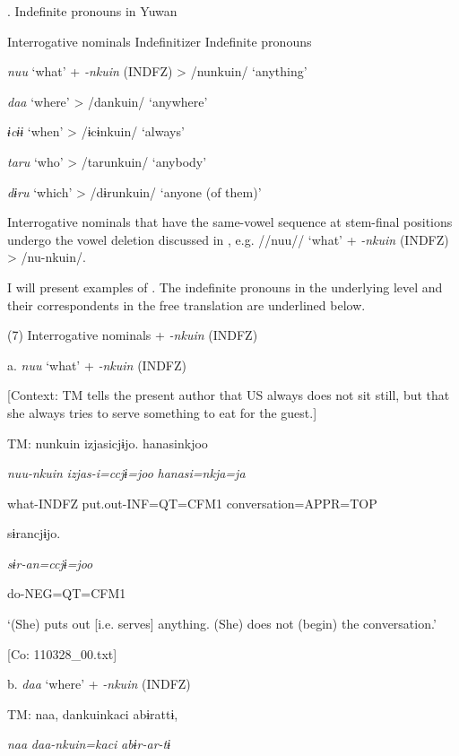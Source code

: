 \begin{styleBeschriftung}
\textmd{}\textmd{. Indefinite pronouns in Yuwan}
\end{styleBeschriftung}

Interrogative nominals    Indefinitizer    Indefinite pronouns

\textit{nuu}  ‘what’  +  \textit{{}-nkuin} (INDFZ)  >  /nunkuin/  ‘anything’

\textit{daa}  ‘where’      >  /dankuin/  ‘anywhere’

\textit{ɨcɨɨ}  ‘when’      >  /ɨcɨnkuin/  ‘always’

\textit{taru}  ‘who’      >  /tarunkuin/  ‘anybody’

\textit{dɨru}  ‘which’      >  /dɨrunkuin/  ‘anyone (of them)’

Interrogative nominals that have the same-vowel sequence at stem-final positions undergo the vowel deletion discussed in , e.g. //nuu// ‘what’ + \textit{{}-nkuin} (INDFZ) > /nu{}-nkuin/.

  I will present examples of . The indefinite pronouns in the underlying level and their correspondents in the free translation are underlined below.

(7)  Interrogative nominals + \textit{{}-nkuin} (INDFZ)

  a.  \textit{nuu} ‘what’ + \textit{{}-nkuin} (INDFZ)

    [Context: TM tells the present author that US always does not sit still, but that she always tries to serve something to eat for the guest.]

    TM:  nunkuin  izjasicjɨjo.  hanasinkjoo

      \textit{nuu-nkuin}  \textit{izjas-i=ccjɨ=joo}  \textit{hanasi=nkja=ja}

      what-INDFZ  put.out-INF=QT=CFM1  conversation=APPR=TOP

      sɨrancjɨjo.

      \textit{sɨr-an=ccjɨ=joo}

      do-NEG=QT=CFM1

      ‘(She) puts out [i.e. serves] anything. (She) does not (begin) the conversation.’

      [Co: 110328\_00.txt]

  b.  \textit{daa} ‘where’ + \textit{{}-nkuin} (INDFZ)

    TM:  naa,  dankuinkaci  abɨrattɨ,

      \textit{naa}  \textit{daa-nkuin=kaci}  \textit{abɨr-ar-tɨ}


